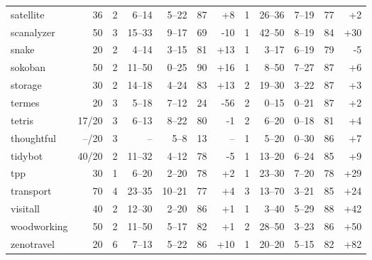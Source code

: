 \documentclass{article}
\begin{document}
\begin{table}
\begin{tabular}{l@{}rr|rrrr|r|rrrr}
    satellite &    36 &   2 &   6--14 &  5--22 &  87 &  {\color{blue}+8} &   1 &   26--36 &  7--19 &  77 &  {\color{blue}+2} \\
   scanalyzer &    50 &   3 &  15--33 &  9--17 &  69 &  {\color{red}-10} &   1 &   42--50 &  8--19 &  84 & {\color{blue}+30} \\
        snake &    20 &   2 &   4--14 &  3--15 &  81 & {\color{blue}+13} &   1 &    3--17 &  6--19 &  79 &   {\color{red}-5} \\
      sokoban &    50 &   2 &  11--50 &  0--25 &  90 & {\color{blue}+16} &   1 &    8--50 &  7--27 &  87 &  {\color{blue}+6} \\
      storage &    30 &   2 &  14--18 &  4--24 &  83 & {\color{blue}+13} &   2 &   19--30 &  3--22 &  87 &  {\color{blue}+3} \\
       termes &    20 &   3 &   5--18 &  7--12 &  24 &  {\color{red}-56} &   2 &    0--15 &  0--21 &  87 &  {\color{blue}+2} \\
       tetris & 17/20 &   3 &   6--13 &  8--22 &  80 &   {\color{red}-1} &   2 &    6--20 &  0--18 &  81 &  {\color{blue}+4} \\
   thoughtful & --/20 &   3 &      -- &   5--8 &  13 &                -- &   1 &    5--20 &  0--30 &  86 &  {\color{blue}+7} \\
      tidybot & 40/20 &   2 &  11--32 &  4--12 &  78 &   {\color{red}-5} &   1 &   13--20 &  6--24 &  85 &  {\color{blue}+9} \\
          tpp &    30 &   1 &   6--20 &  2--20 &  78 &  {\color{blue}+2} &   1 &   23--30 &  7--20 &  78 & {\color{blue}+29} \\
    transport &    70 &   4 &  23--35 & 10--21 &  77 &  {\color{blue}+4} &   3 &   13--70 &  3--21 &  85 & {\color{blue}+24} \\
     visitall &    40 &   2 &  12--30 &  2--20 &  86 &  {\color{blue}+1} &   1 &    3--40 &  5--29 &  88 & {\color{blue}+42} \\
  woodworking &    50 &   2 &  11--50 &  5--17 &  82 &  {\color{blue}+1} &   2 &   28--50 &  3--23 &  86 & {\color{blue}+50} \\
   zenotravel &    20 &   6 &   7--13 &  5--22 &  86 & {\color{blue}+10} &   1 &   20--20 &  5--15 &  82 & {\color{blue}+82} \\
\bottomrule
\end{tabular}

            \end{table}
            
\end{document}

